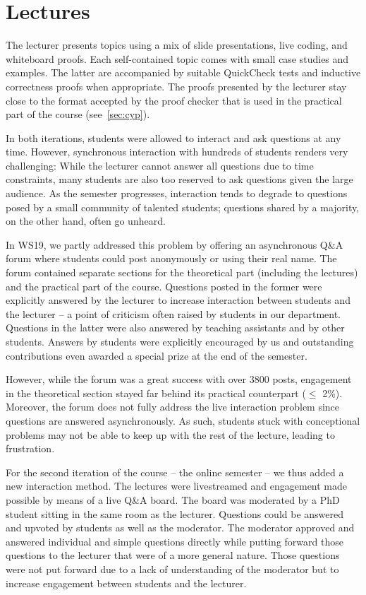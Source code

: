 \section{Lectures}\label{sec:lectures}

The lecturer presents topics using a mix of
slide presentations,
live coding, and whiteboard proofs.
Each self-contained topic comes with small case studies and examples.
The latter are accompanied by suitable QuickCheck tests
and inductive correctness proofs when appropriate.
The proofs presented by the lecturer stay close to the format accepted by the proof checker that is used in the practical part of the course (see~\cref{sec:cyp}).

In both iterations, students were allowed to interact and ask questions at any time.
However, synchronous interaction with hundreds of students renders very challenging:
While the lecturer cannot answer all questions due to time constraints,
many students are also too reserved to ask questions given the large audience.
As the semester progresses, interaction tends to degrade to
questions posed by a small community of talented students;
questions shared by a majority, on the other hand, often go unheard.

In WS19, we partly addressed this problem by offering an asynchronous Q\&A forum
where students could post anonymously or using their real name.
The forum contained separate sections for the theoretical part (including the lectures)
and the practical part of the course.
Questions posted in the former were explicitly answered by the lecturer
to increase interaction between students and the lecturer -- a point of criticism often raised by students in our department.
Questions in the latter were also answered by teaching assistants and by other students.
Answers by students were explicitly encouraged by us and
outstanding contributions even awarded a special prize at the end of the semester.

However, while the forum was a great success with over 3800 posts,
engagement in the theoretical section stayed far behind its practical counterpart ($\leq$ 2\%).
Moreover, the forum does not fully address the live interaction problem since
questions are answered asynchronously.
As such, students stuck with conceptional problems may not be able
to keep up with the rest of the lecture,
leading to frustration.

For the second iteration of the course -- the online semester --
we thus added a new interaction method.
The lectures were livestreamed and
engagement made possible by means of a live Q\&A board.
The board was moderated by a PhD student
sitting in the same room as the lecturer.
Questions could be answered and upvoted by students as well as the moderator.
The moderator approved and answered individual and simple questions directly while putting forward those questions to the lecturer that were of a more general nature.
Those questions were not put forward due to a lack of understanding of the moderator
but to increase engagement between students and the lecturer.

